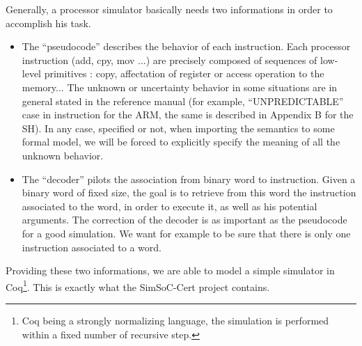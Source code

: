 \documentclass[a4paper, 11pt]{article}
\newcommand{\SScert}{SimSoC-Cert\xspace}
\begin{document}
Generally, a processor simulator basically needs two informations in order to accomplish his task.
\begin{itemize}
\item The ``pseudocode'' describes the behavior of each instruction. Each processor instruction (add, cpy, mov ...) are precisely composed of sequences of low-level primitives : copy, affectation of register or access operation to the memory... The unknown or uncertainty behavior in some situations are in general stated in the reference manual (for example, ``UNPREDICTABLE'' case in instruction for the ARM, the same is described in Appendix B for the SH). In any case, specified or not, when importing the semantics to some formal model, we will be forced to explicitly specify the meaning of all the unknown behavior.
\item The ``decoder'' pilots the association from binary word to instruction. Given a binary word of fixed size, the goal is to retrieve from this word the instruction associated to the word, in order to execute it, as well as his potential arguments. 
The correction of the decoder is as important as the pseudocode for a good simulation. We want for example to be sure that there is only one instruction associated to a word.
\end{itemize}
Providing these two informations, we are able to model a simple simulator in Coq\footnote{Coq being a strongly normalizing language, the simulation is performed within a fixed number of recursive step.}. This is exactly what the \SScert project contains.
\end{document}
